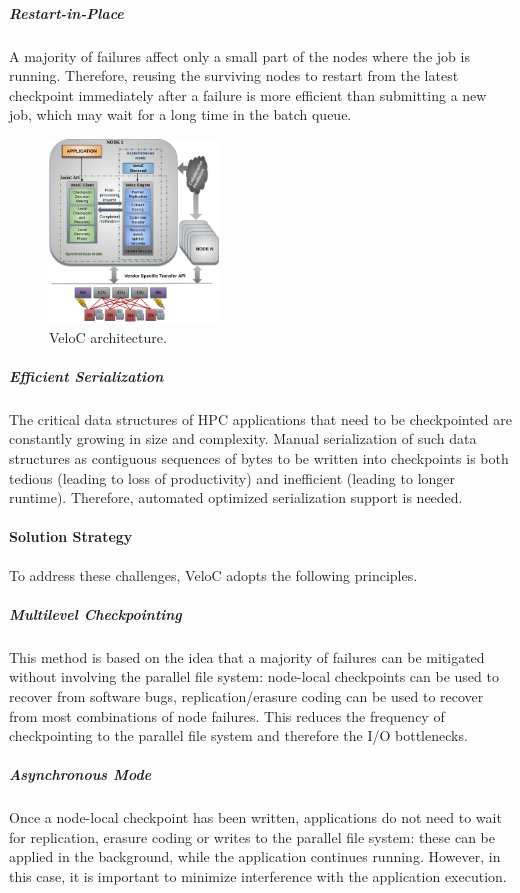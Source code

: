 \subparagraph{Restart-in-Place} A majority of failures affect
only a small part of the nodes where the job is running. Therefore,
reusing the surviving nodes to restart from the latest checkpoint
immediately after a failure is more efficient than submitting a new job,
which may wait for a long time in the batch queue.

\begin{figure}
  \includegraphics[width=0.4\textwidth]{projects/2.3.4-DataViz/2.3.4.14-VeloC-SZ/veloc-arch}
  \caption{VeloC architecture.}%
  \label{fig:veloc:arch}%
\end{figure}

\subparagraph{Efficient Serialization} The critical data structures
of HPC applications that need to be checkpointed are constantly
growing in size and complexity. Manual serialization of such data
structures as contiguous sequences of bytes to be written into
checkpoints is both tedious (leading to loss of productivity) and
inefficient (leading to longer runtime). Therefore, automated
optimized serialization support is needed.

\paragraph{Solution Strategy}

To address these challenges, VeloC adopts the following principles.

\subparagraph{Multilevel Checkpointing} This method is based on the idea
that a majority of failures can be mitigated without involving the
parallel file system: node-local checkpoints can be used to recover
from software bugs, replication/erasure coding can be used to recover
from most combinations of node failures. This reduces the frequency of
checkpointing to the parallel file system and therefore the I/O
bottlenecks.

\subparagraph{Asynchronous Mode} Once a node-local checkpoint has
been written, applications do not need to wait for replication,
erasure coding or writes to the parallel file system: these can be
applied in the background, while the application continues
running. However, in this case, it is important to minimize
interference with the application execution.


